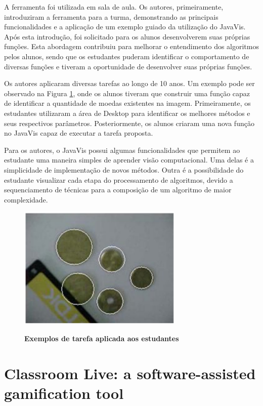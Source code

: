 \documentclass[
	12pt,				%
	oneside,			%
	a4paper,			%
	english,			%
	french,				%
	spanish,			%
	brazil,				%
	]{abntex2}
\begin{document}
A ferramenta foi utilizada em sala de aula. Os autores, primeiramente, introduziram a ferramenta para a turma, demonstrando as principais funcionalidades e a aplicação de um exemplo guiado da utilização do JavaVis. Após esta introdução, foi solicitado para os alunos desenvolverem suas próprias funções. Esta abordagem contribuiu para melhorar o entendimento dos algoritmos pelos alunos, sendo que os estudantes puderam identificar o comportamento de diversas funções e tiveram a oportunidade de desenvolver suas próprias funções.

Os autores aplicaram diversas tarefas ao longo de 10 anos. Um exemplo pode ser observado na Figura \ref{fig:javavis_avaliacao}, onde os alunos tiveram que construir uma função capaz de identificar a quantidade de moedas existentes na imagem. Primeiramente, os estudantes utilizaram a área de Desktop para identificar os melhores métodos e seus respectivos parâmetros. Posteriormente, os alunos criaram uma nova função no JavaVis capaz de executar a tarefa proposta.

Para os autores, o JavaVis possui algumas funcionalidades que permitem ao estudante uma maneira simples de aprender visão computacional. Uma delas é a simplicidade de implementação de novos métodos. Outra é a possibilidade do estudante visualizar cada etapa do processamento de algoritmos, devido a sequenciamento de técnicas para a composição de um algoritmo de maior complexidade.

\begin{figure}[ht]
\centering
\caption{\textbf{Exemplos de tarefa aplicada aos estudantes}}
\includegraphics[width=0.7\textwidth]{imagens/javavis_avaliacao.png}
\label{fig:javavis_avaliacao}
\end{figure}

\section{Classroom Live: a software-assisted gamification tool}
\label{sec:classrom}
\end{document}
